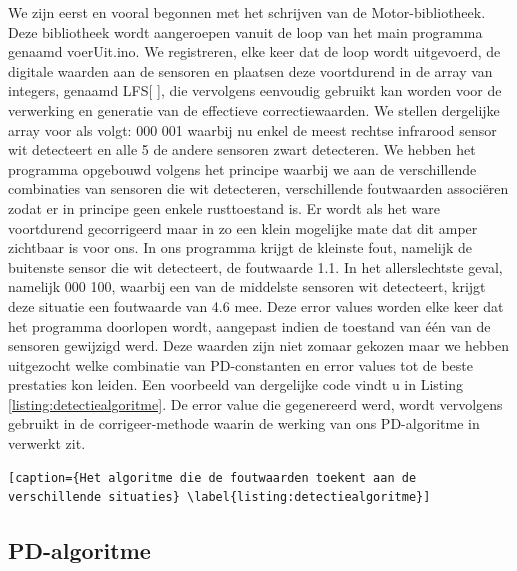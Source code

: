 We zijn eerst en vooral begonnen met het schrijven van de Motor-bibliotheek. Deze bibliotheek wordt aangeroepen vanuit de loop van het main programma genaamd voerUit.ino. We registreren, elke keer dat de loop wordt uitgevoerd, de digitale waarden aan de sensoren en plaatsen deze voortdurend in de array van integers, genaamd LFS[ ], die vervolgens eenvoudig gebruikt kan worden voor de verwerking en generatie van de effectieve correctiewaarden. We stellen dergelijke array voor als volgt: 000 001 waarbij nu enkel de meest rechtse infrarood sensor wit detecteert en alle 5 de andere sensoren zwart detecteren. We hebben het programma opgebouwd volgens het principe waarbij we aan de verschillende combinaties van sensoren die wit detecteren, verschillende foutwaarden associ\"eren zodat er in principe geen enkele rusttoestand is. Er wordt als het ware voortdurend gecorrigeerd maar in zo een klein mogelijke mate dat dit amper zichtbaar is voor ons. In ons programma krijgt de kleinste fout, namelijk de buitenste sensor die wit detecteert, de foutwaarde 1.1. In het allerslechtste geval, namelijk 000 100, waarbij een van de middelste sensoren wit detecteert, krijgt deze situatie een foutwaarde van 4.6 mee. Deze error values worden elke keer dat het programma doorlopen wordt, aangepast indien de toestand van \'e\'en van de sensoren gewijzigd werd. Deze waarden zijn niet zomaar gekozen maar we hebben uitgezocht welke combinatie van PD-constanten en error values tot de beste prestaties kon leiden. Een voorbeeld van dergelijke code vindt u in Listing \ref{listing:detectiealgoritme}. De error value die gegenereerd werd, wordt vervolgens gebruikt in de corrigeer-methode waarin de werking van ons PD-algoritme in verwerkt zit.


\begin{lstlisting}[caption={Het algoritme die de foutwaarden toekent aan de verschillende situaties} \label{listing:detectiealgoritme}]
\end{lstlisting}

\subsection{PD-algoritme}

